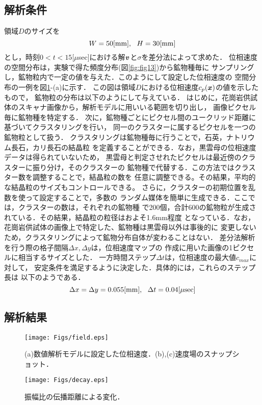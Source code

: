 \subsection{解析条件}
領域$D$のサイズを
\begin{equation}
	W=50[{\rm mm}], \ \  H=30[{\rm mm}]
	\label{eqn:dom_size}
\end{equation}
とし，時刻$ 0 <t < 15[\mu$sec]における解$\mbox{\boldmath{$v$}}$と$\sigma$を差分法によって求めた．
位相速度の空間分布は，実験で得た頻度分布(図\ref{fig:fig13})から鉱物種毎に
サンプリングし，鉱物粒内で一定の値を与えた．このようにして設定した位相速度の
空間分布の一例を図\ref{fig:fig16}-(a)に示す．
この図は領域$D$における位相速度$c_p(\mbox{\boldmath{$x$}})$の値を示したもので，
鉱物粒の分布は以下のようにして与えている．
はじめに，花崗岩供試体のスキャナ画像から，解析モデルに用いいる範囲を切り出し，
画像ピクセル毎に鉱物種を特定する．
次に，鉱物種ごとにピクセル間のユークリッド距離に基づいてクラスタリングを行い，
同一のクラスターに属するピクセルを一つの鉱物粒として扱う．
クラスタリングは鉱物種毎に行うことで，石英，ナトリウム長石，カリ長石の結晶粒
を定義することができる．なお，黒雲母の位相速度データは得られていないため，
黒雲母と判定させれたピクセルは最近傍のクラスターに振り分け，そのクラスターの
鉱物種で代替する．この方法ではクラスター数を調整することで，結晶粒の数を
任意に調整できる。その結果，平均的な結晶粒のサイズもコントロールできる。
さらに，クラスターの初期位置を乱数を使って設定することで，多数の
ランダム媒体を簡単に生成できる．ここでは，クラスターの数は，それぞれの鉱物種
で200個，合計600の鉱物粒が生成されている．その結果，結晶粒の粒径はおよそ1.6mm程度
となっている．なお，花崗岩供試体の画像上で特定した、鉱物種は黒雲母以外は事後的に
変更しないため，クラスタリングによって鉱物分布自体が変わることはない．
差分法解析を行う際の格子間隔$\Delta x, \Delta y$は，位相速度マップの
作成に用いた画像の1ピクセルに相当するサイズとした．
一方時間ステップ$\Delta t$は，位相速度の最大値$c_{max}$に対して，
安定条件を満足するように決定した．具体的には，これらのステップ長は
以下のようである．
\begin{equation}
	\Delta x = \Delta y= 0.055[{\rm mm}], \ \ \Delta t=0.04[\mu{\rm sec}]
	\label{eqn:}
\end{equation}
\subsection{解析結果}
\begin{figure}
\begin{center}
	\texttt{[image: Figs/field.eps]}
	\caption{(a)数値解析モデルに設定した位相速度．(b),(c)速度場のスナップショット．}
	\label{fig:fig16}
\end{center}
\end{figure}

\begin{figure}
\begin{center}
	\texttt{[image: Figs/decay.eps]}
	\caption{振幅比の伝播距離による変化．}
	\label{fig:fig17}
\end{center}
\end{figure}
